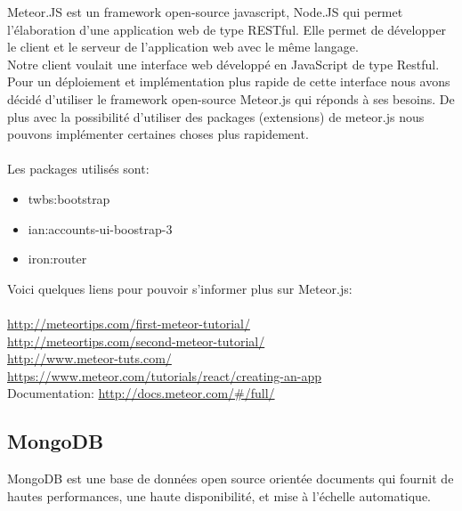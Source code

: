 Meteor.JS est un framework open-source javascript, Node.JS qui permet l'élaboration d'une application web de type RESTful. Elle permet de développer le client et le serveur de l'application web avec le même langage.\\
Notre client voulait une interface web développé en JavaScript de type Restful. Pour un déploiement et implémentation plus rapide de cette interface nous avons décidé d'utiliser le framework open-source Meteor.js qui réponds à ses besoins. De plus avec la possibilité d'utiliser des packages (extensions) de meteor.js nous pouvons implémenter certaines choses plus rapidement.\\
\\
Les packages utilisés sont:
\begin{itemize}
\item twbs:bootstrap
\item ian:accounts-ui-boostrap-3
\item iron:router
\end{itemize}

\vspace{0.5cm}
Voici quelques liens pour pouvoir s'informer plus sur Meteor.js:
\\
\\
\url{http://meteortips.com/first-meteor-tutorial/}\\
\url{http://meteortips.com/second-meteor-tutorial/}\\
\url{http://www.meteor-tuts.com/}\\
\url{https://www.meteor.com/tutorials/react/creating-an-app}\\
Documentation: \url{http://docs.meteor.com/#/full/}


\subsection{MongoDB}\cite{MongoDB}

MongoDB est une base de données open source orientée documents qui fournit de hautes performances, une haute disponibilité, et mise à l'échelle automatique.
